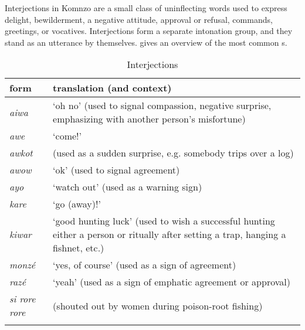 Interjections in Komnzo are a small class of uninflecting words used to express delight, bewilderment, a negative attitude, approval or refusal, commands, greetings, or vocatives. Interjections form a separate intonation group, and they stand as an utterance by themselves.  gives an overview of the most common s.

\begin{table}
\caption{Interjections}
\label{interjections-table}
	\begin{tabularx}{\textwidth}{Xp{}}
		\lsptoprule
		{form}&{translation (and context)}\\\midrule
		\emph{aiwa}&`oh no' (used to signal compassion, negative surprise, emphasizing with another person's misfortune)\\
		\emph{awe}&`come!'\\
		\emph{awkot}& (used as a sudden surprise, e.g. somebody trips over a log)\\
		\emph{awow}&`ok' (used to signal agreement)\\
		\emph{ayo}&`watch out' (used as a warning sign)\\
		\emph{kare}&`go (away)!'\\
		\emph{kiwar}&`good hunting luck' (used to wish a successful hunting either a person or ritually after setting a trap, hanging a fishnet, etc.)\\
		\emph{monzé}&`yes, of course' (used as a sign of agreement)\\
		\emph{razé}&`yeah' (used as a sign of emphatic agreement or approval)\\
		\emph{si rore rore}& (shouted out by women during poison-root fishing)\\
		\lspbottomrule
	\end{tabularx}
\end{table}%
